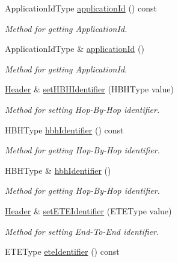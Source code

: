 \begin{DoxyCompactItemize}
Application\+Id\+Type \hyperlink{classDiameter_1_1Packet_1_1Header_a6314789114068d9f3ba106e480cef70b}{application\+Id} () const
\begin{DoxyCompactList}\small\item\em Method for getting Application\+Id. \end{DoxyCompactList}\item 
Application\+Id\+Type \& \hyperlink{classDiameter_1_1Packet_1_1Header_a3dcde95d29bb35f44787a83ca314ea97}{application\+Id} ()
\begin{DoxyCompactList}\small\item\em Method for getting Application\+Id. \end{DoxyCompactList}\item 
\hyperlink{classDiameter_1_1Packet_1_1Header}{Header} \& \hyperlink{classDiameter_1_1Packet_1_1Header_a5e4506d6ecce87505f73e34d9c9ec043}{set\+H\+B\+H\+Identifier} (H\+B\+H\+Type value)
\begin{DoxyCompactList}\small\item\em Method for setting Hop-\/\+By-\/\+Hop identifier. \end{DoxyCompactList}\item 
H\+B\+H\+Type \hyperlink{classDiameter_1_1Packet_1_1Header_a52c9e1cf5ccc5902e9950c35b35edb28}{hbh\+Identifier} () const
\begin{DoxyCompactList}\small\item\em Method for getting Hop-\/\+By-\/\+Hop identifier. \end{DoxyCompactList}\item 
H\+B\+H\+Type \& \hyperlink{classDiameter_1_1Packet_1_1Header_abd0b298c5185b43c44e10a52d497b85d}{hbh\+Identifier} ()
\begin{DoxyCompactList}\small\item\em Method for getting Hop-\/\+By-\/\+Hop identifier. \end{DoxyCompactList}\item 
\hyperlink{classDiameter_1_1Packet_1_1Header}{Header} \& \hyperlink{classDiameter_1_1Packet_1_1Header_a189b15e15e11b78c0a8cb9d90b51e5b0}{set\+E\+T\+E\+Identifier} (E\+T\+E\+Type value)
\begin{DoxyCompactList}\small\item\em Method for setting End-\/\+To-\/\+End identifier. \end{DoxyCompactList}\item 
E\+T\+E\+Type \hyperlink{classDiameter_1_1Packet_1_1Header_a9e2c00f1ef8ed89a7b4810005c33fa6e}{ete\+Identifier} () const

\end{DoxyCompactItemize}
